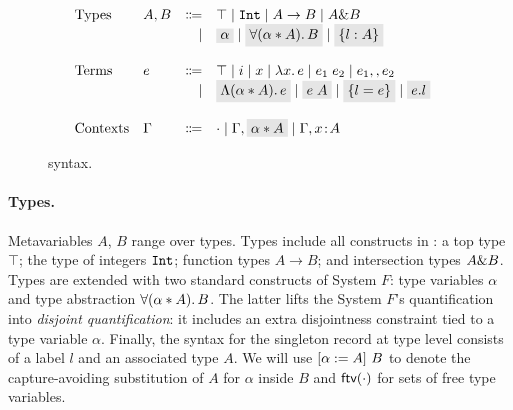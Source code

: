 \begin{figure}[!t]
  \[
    \begin{array}{l}
      \begin{array}{llrll}
        \text{Types}
        & A, B & \Coloneqq & \top \mid \tyint \mid A \to B \mid A \inter B & \\ 
        &      & \mid &
                 \highlight{$\alpha$} \mid \highlight{$\fordis \alpha A B$} 
                 \mid \highlight{$\recordType l A$} & \\

        \\
        \text{Terms}
        & e & \Coloneqq & \top \mid i \mid x \mid \lamty x A e \mid \app {e_1} {e_2} 
              \mid e_1 \mergeop e_2 & \\
        &   & \mid & \highlight{$\blamdis \alpha A e$} \mid \highlight{$\tapp e A$} \mid 
              \highlight{$\recordCon l e$} \mid \highlight{$\recordProj e l$}     & \\

        \\
        \text{Contexts}
        & \Gamma & \Coloneqq & \cdot
                   \mid \Gamma, \highlight{$\alpha \disjoint A$}
                   \mid \Gamma, x \oftype A  & \\
      \end{array}
    \end{array}
  \]

  \caption{\name syntax.}
  \label{fig:fi-syntax}
\end{figure}

\paragraph{Types.} 
Metavariables $A$, $B$ range over types. 
Types include all constructs in \oldname: a top type $\top$; 
the type of integers $\texttt{Int}$;
function types $A \to B$; and intersection types $A \& B$.
Types are extended with two standard constructs of System $F$: 
type variables $\alpha$ and type abstraction $\forall (\alpha * A).\, B$. 
The latter lifts the System $F$'s quantification into \emph{disjoint quantification}:
it includes an extra disjointness constraint tied to a type variable $\alpha$.
Finally, the syntax for the singleton record at type level consists of a label $l$ and
an associated type $A$.
We will use $\lbrack \alpha := A \rbrack~ {B}$
to denote the capture-avoiding substitution of $A$ for $\alpha$ inside $B$ and
$\textsf{ftv}(\cdot)$ for sets of free type variables. 

